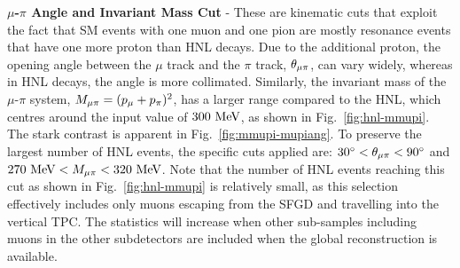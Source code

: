         \textbf{$\mu$-$\pi$ Angle and Invariant Mass Cut} - These are kinematic cuts that exploit the fact that SM events with one muon and one pion are mostly resonance events that have one more proton than HNL decays. Due to the additional proton, the opening angle between the $\mu$ track and the $\pi$ track, $\theta_{\mu\pi}$, can vary widely, whereas in HNL decays, the angle is more collimated. Similarly, the invariant mass of the $\mu$-$\pi$ system, $M_{\mu\pi}=(p_{\mu}+p_{\pi})^2$, has a larger range compared to the HNL, which centres around the input value of $300~\textrm{MeV}$, as shown in Fig.~\ref{fig:hnl-mmupi}.
        The stark contrast is apparent in Fig.~\ref{fig:mmupi-mupiang}. To preserve the largest number of HNL events, the specific cuts applied are: $30^\circ < \theta_{\mu\pi} < 90^\circ$ and $270~\textrm{MeV}<M_{\mu\pi}<320~\textrm{MeV}$. 
        Note that the number of HNL events reaching this cut as shown in Fig.~\ref{fig:hnl-mmupi} is relatively small, as this selection effectively includes only muons escaping from the SFGD and travelling into the vertical TPC. 
        The statistics will increase when other sub-samples including muons in the other subdetectors are included when the global reconstruction is available.
